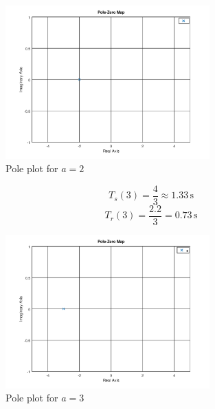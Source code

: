\documentclass[a4paper, 12pt]{article}
\begin{document}
			\begin{figure}[H]
				\centering
				\includegraphics[width=0.7\textwidth]{img/1st_2.png}
				\caption{Pole plot for $a = 2$}
				\label{fig:1}
			\end{figure}
			\[
				T_s(3) = \frac{4}{3} \approx 1.33\,\text{s}
			\]
			\[
				T_r(3) = \frac{2.2}{3} = 0.73\,\text{s}
			\]

			\begin{figure}[H]
				\centering
				\includegraphics[width=0.7\textwidth]{img/1st_3.png}
				\caption{Pole plot for $a = 3$}
				\label{fig:1}
			\end{figure}
\end{document}
